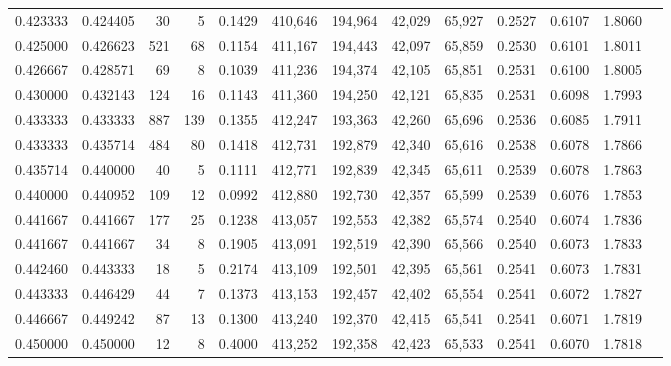 \begin{tabular}{rrrrrrrrrrrrr}
0.423333 & 0.424405 &     30 &      5 &                                     0.1429 & 410,646 & 194,964 &  42,029 &  65,927 & 0.2527 & 0.6107 & 1.8060 \\
0.425000 & 0.426623 &    521 &     68 &                                     0.1154 & 411,167 & 194,443 &  42,097 &  65,859 & 0.2530 & 0.6101 & 1.8011 \\
0.426667 & 0.428571 &     69 &      8 &                                     0.1039 & 411,236 & 194,374 &  42,105 &  65,851 & 0.2531 & 0.6100 & 1.8005 \\
0.430000 & 0.432143 &    124 &     16 &                                     0.1143 & 411,360 & 194,250 &  42,121 &  65,835 & 0.2531 & 0.6098 & 1.7993 \\
0.433333 & 0.433333 &    887 &    139 &                                     0.1355 & 412,247 & 193,363 &  42,260 &  65,696 & 0.2536 & 0.6085 & 1.7911 \\
0.433333 & 0.435714 &    484 &     80 &                                     0.1418 & 412,731 & 192,879 &  42,340 &  65,616 & 0.2538 & 0.6078 & 1.7866 \\
0.435714 & 0.440000 &     40 &      5 &                                     0.1111 & 412,771 & 192,839 &  42,345 &  65,611 & 0.2539 & 0.6078 & 1.7863 \\
0.440000 & 0.440952 &    109 &     12 &                                     0.0992 & 412,880 & 192,730 &  42,357 &  65,599 & 0.2539 & 0.6076 & 1.7853 \\
0.441667 & 0.441667 &    177 &     25 &                                     0.1238 & 413,057 & 192,553 &  42,382 &  65,574 & 0.2540 & 0.6074 & 1.7836 \\
0.441667 & 0.441667 &     34 &      8 &                                     0.1905 & 413,091 & 192,519 &  42,390 &  65,566 & 0.2540 & 0.6073 & 1.7833 \\
0.442460 & 0.443333 &     18 &      5 &                                     0.2174 & 413,109 & 192,501 &  42,395 &  65,561 & 0.2541 & 0.6073 & 1.7831 \\
0.443333 & 0.446429 &     44 &      7 &                                     0.1373 & 413,153 & 192,457 &  42,402 &  65,554 & 0.2541 & 0.6072 & 1.7827 \\
0.446667 & 0.449242 &     87 &     13 &                                     0.1300 & 413,240 & 192,370 &  42,415 &  65,541 & 0.2541 & 0.6071 & 1.7819 \\
0.450000 & 0.450000 &     12 &      8 &                                     0.4000 & 413,252 & 192,358 &  42,423 &  65,533 & 0.2541 & 0.6070 & 1.7818 \\

\end{tabular}
